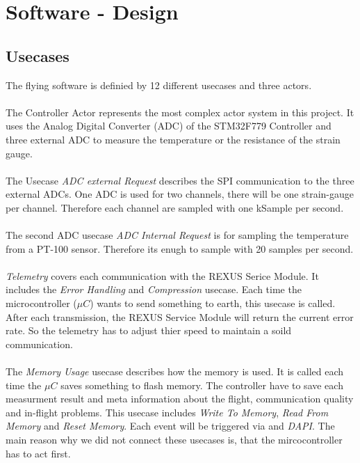 \section{Software - Design}
\subsection{Usecases}
The flying software is definied by 12 different usecases and three actors. \\ \\
The Controller Actor represents the most complex actor system in this project. It uses the Analog Digital Converter (ADC) of the STM32F779 Controller and three external ADC to measure the temperature or the resistance of the strain gauge. \\ \\ 
The Usecase \textit{ADC external Request} describes the SPI communication to the three external ADCs. One ADC is used for two channels, there will be one strain-gauge per channel.  Therefore each channel are sampled with  one kSample per second. \\ \\
The second ADC usecase \textit{ADC Internal Request} is for sampling the temperature from a PT-100 sensor. Therefore its enugh to sample with 20 samples per second. \\ \\
\textit{Telemetry} covers each communication with the REXUS Serice Module. It includes the \textit{Error Handling} and \textit{Compression} usecase. Each time the microcontroller ($\mu C$) wants to send something to earth, this usecase is called. After each transmission, the REXUS Service Module will return the current error rate. So the telemetry has to adjust thier speed to maintain a soild communication. \\ \\
The \textit{Memory Usage} usecase describes how the memory is used. It is called each time the $\mu C$ saves something to flash memory. The controller have to save each measurment result and meta information about the flight, communication quality and in-flight problems. 
This usecase includes \textit{Write To Memory}, \textit{Read From Memory} and \textit{Reset Memory}. Each event will be triggered via  and \textit{DAPI}. The main reason why we did not connect these usecases is, that the mircocontroller has to act  first.  \\ \\ 
